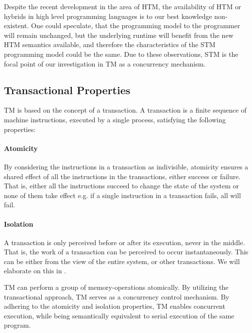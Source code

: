 Despite the recent development in the area of \ac{HTM}, the availability of \ac{HTM} or hybrids in high level programming languages is to our best knowledge non-existent. One could speculate, that the programming model to the programmer will remain unchanged, but the underlying runtime will benefit from the new \ac{HTM} semantics available, and therefore the characteristics of the \ac{STM} programming model could be the same. Due to these observations, \ac{STM} is the focal point of our investigation in \ac{TM} as a concurrency mechanism. 

\subsection{Transactional Properties}
\label{sec:stm_tm_properties}
\ac{TM} is based on the concept of a transaction. A transaction is a finite sequence of machine instructions, executed by a single process, satisfying the following properties\cite[p. 2]{herlihy2011tm}:

\paragraph{Atomicity} By considering the instructions in a transaction as indivisible, atomicity ensures a shared effect of all the instructions in the transactions, either success or failure. That is, either all the instructions succeed to change the state of the system or none of them take effect e.g. if a single instruction in a transaction fails, all will fail.
\paragraph{Isolation} A transaction is only perceived before or after its execution, never in the middle. That is, the work of a transaction can be perceived to occur instantaneously. This can be either from the view of the entire system, or other transactions. We will elaborate on this in . 

\ac{TM} can perform a group of memory-operations atomically\cite[48]{harris2005composable}. By utilizing the transactional approach, \ac{TM} serves as a concurrency control mechanism. By adhering to the atomicity and isolation properties, \ac{TM} enables concurrent execution, while being semantically equivalent to serial execution of the same program.

